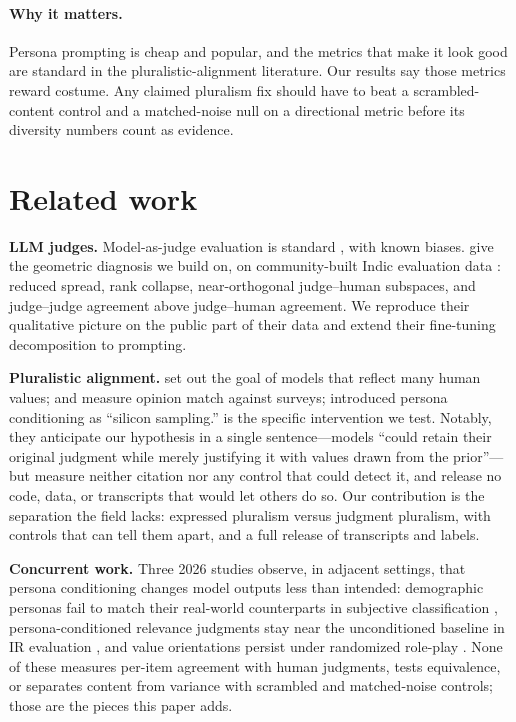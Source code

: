 \documentclass{article}
\begin{document}
\paragraph{Why it matters.} Persona prompting is cheap and popular, and the metrics that make it look good are standard in the pluralistic-alignment literature. Our results say those metrics reward costume. Any claimed pluralism fix should have to beat a scrambled-content control and a matched-noise null on a directional metric before its diversity numbers count as evidence.

\section{Related work}

\textbf{LLM judges.} Model-as-judge evaluation is standard \citep{zheng2023judging}, with known biases. \citet{mukherjee2026geometry} give the geometric diagnosis we build on, on community-built Indic evaluation data \citep{watts2024pariksha}: reduced spread, rank collapse, near-orthogonal judge--human subspaces, and judge--judge agreement above judge--human agreement. We reproduce their qualitative picture on the public part of their data and extend their fine-tuning decomposition to prompting.

\textbf{Pluralistic alignment.} \citet{sorensen2024roadmap,sorensen2024value} set out the goal of models that reflect many human values; \citet{santurkar2023whose} and \citet{durmus2023towards} measure opinion match against surveys; \citet{argyle2023out} introduced persona conditioning as ``silicon sampling.'' \citet{russo2026pluralistic} is the specific intervention we test. Notably, they anticipate our hypothesis in a single sentence---models ``could retain their original judgment while merely justifying it with values drawn from the prior''---but measure neither citation nor any control that could detect it, and release no code, data, or transcripts that would let others do so. Our contribution is the separation the field lacks: expressed pluralism versus judgment pluralism, with controls that can tell them apart, and a full release of transcripts and labels.

\textbf{Concurrent work.} Three 2026 studies observe, in adjacent settings, that persona conditioning changes model outputs less than intended: demographic personas fail to match their real-world counterparts in subjective classification \citep{yang2026persona}, persona-conditioned relevance judgments stay near the unconditioned baseline in IR evaluation \citep{mohtadi2026persona}, and value orientations persist under randomized role-play \citep{lee2026inertia}. None of these measures per-item agreement with human judgments, tests equivalence, or separates content from variance with scrambled and matched-noise controls; those are the pieces this paper adds.
\end{document}
